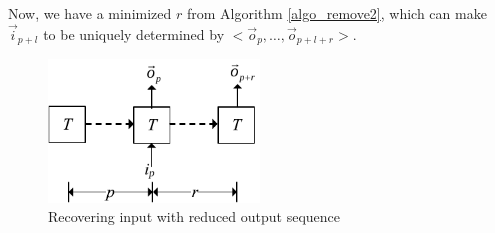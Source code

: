\documentclass[runningheads,a4paper,orivec]{llncs}
\begin{document}
% 
% 

Now, 
we have a minimized $r$ from Algorithm \ref{algo_remove2},
which can make $\vec{i}_{p+l}$ to be uniquely determined by $<\vec{o}_{p},\dots,\vec{o}_{p+l+r}>$.

\begin{figure}[b]
\begin{center}
\includegraphics[width=0.5\textwidth]{pc1}
\end{center}
\caption{Recovering input with reduced output sequence}
  \label{fig_pc1}
\end{figure}
\end{document}
